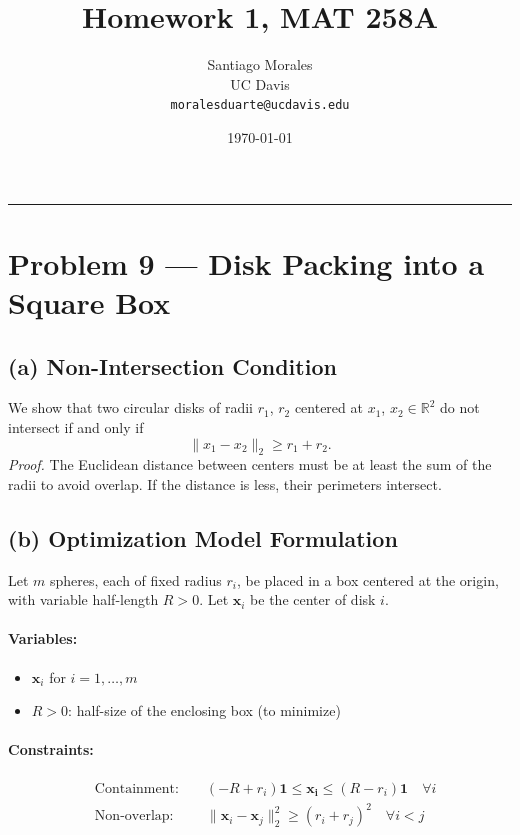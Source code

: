 \documentclass[11pt]{article}
\title{\vspace{-1cm} \textbf{Homework 1, MAT 258A}}
\author{Santiago Morales \\ UC Davis \\ \texttt{moralesduarte@ucdavis.edu}}
\date{\today}
\begin{document}
\maketitle
\vspace{-1em}
\hrule
\vspace{1em}

\section*{Problem 9 — Disk Packing into a Square Box}

\subsection*{(a) Non-Intersection Condition}

We show that two circular disks of radii $r_1$, $r_2$ centered at $x_1$, $x_2 \in \mathbb{R}^2$ do not intersect if and only if
\[
\|x_1 - x_2\|_2 \geq r_1 + r_2.
\]
\textit{Proof.} The Euclidean distance between centers must be at least the sum of the radii to avoid overlap. If the distance is less, their perimeters intersect.

\subsection*{(b) Optimization Model Formulation}

Let $m$ spheres, each of fixed radius $r_i$, be placed in a box centered at the origin, with variable half-length $R > 0$. Let $\mathbf{x}_i$ be the center of disk $i$.

\paragraph{Variables:}
\begin{itemize}[noitemsep]
    \item $\mathbf{x}_i$ for $i = 1, \dots, m$
    \item $R > 0$: half-size of the enclosing box (to minimize)
\end{itemize}

\paragraph{Constraints:}
\begin{align*}
    & \text{Containment: } && (-R + r_i)\mathbf{1} \leq \mathbf{x_i} \leq (R - r_i)\mathbf{1}  \quad \forall i \\
    & \text{Non-overlap: } && \|\mathbf{x}_i - \mathbf{x}_j\|_2^2 \geq (r_i + r_j)^2 \quad \forall i < j
\end{align*}
\end{document}
